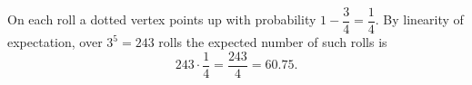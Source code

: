 On each roll a dotted vertex points up with probability $1-\dfrac34=\dfrac14$. By linearity of expectation, over $3^5=243$ rolls the expected number of such rolls is
\[243\cdot\dfrac14=\boxed{\dfrac{243}{4}}=60.75.\]
